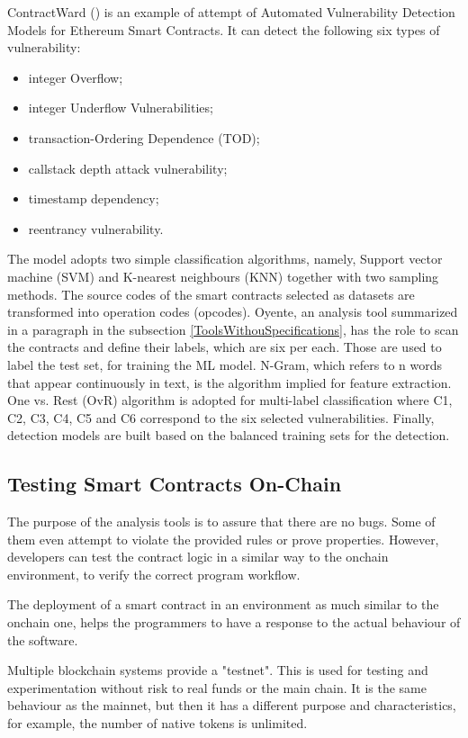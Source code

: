 \documentclass[a4paper,sigconf, language=french,
language=german, language=spanish, language=english]{acmart}
\begin{document}
ContractWard (\cite{MLtool}) is an example of attempt of Automated Vulnerability Detection Models for Ethereum Smart Contracts. It can detect the following six types of vulnerability: 
\begin{itemize}
    \item integer Overflow;
    \item integer Underflow Vulnerabilities;
    \item transaction-Ordering Dependence (TOD);
    \item callstack depth attack vulnerability;
    \item timestamp dependency;
    \item reentrancy vulnerability.
\end{itemize}

The model adopts two simple classification algorithms, namely, Support vector machine (SVM) and K-nearest neighbours (KNN) together with two sampling methods.
The source codes of the smart contracts selected as datasets are transformed into operation codes (opcodes). Oyente, an analysis tool summarized in a paragraph in the subsection \autoref{ToolsWithouSpecifications}, has the role to scan the contracts and define their labels, which are six per each. Those are used to label the test set, for training the ML model.  N-Gram, which refers to n words that appear
continuously in text, is the algorithm implied for feature extraction.
One vs. Rest (OvR) algorithm is adopted for multi-label classification where
C1, C2, C3, C4, C5 and C6 correspond to the six selected vulnerabilities. 
Finally, detection models are built based on the balanced
training sets for the detection.

\subsection{Testing Smart Contracts On-Chain}
The purpose of the analysis tools is to assure that there are no bugs. Some of them even attempt to violate the provided rules or prove properties. However, developers can test the contract logic in a similar way to the onchain environment, to verify the correct program workflow.

The deployment of a smart contract in an environment as much similar to the onchain one, helps the programmers to have a response to the actual behaviour of the software.

Multiple blockchain systems provide a "testnet". This is used for testing and experimentation without risk to real funds or the main chain. It is the same behaviour as the mainnet, but then it has a different purpose and characteristics, for example, the number of native tokens is unlimited.
\end{document}
